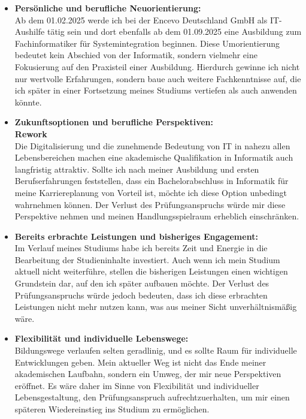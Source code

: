 \documentclass[a4paper,12pt]{article}
\begin{document}
\begin{itemize}[label={-}, labelwidth=2em, left=1em]
\item \textbf{Persönliche und berufliche Neuorientierung:}\\
Ab dem 01.02.2025 werde ich bei der Encevo Deutschland GmbH als IT-Aushilfe tätig sein und dort ebenfalls ab dem 01.09.2025 eine Ausbildung zum Fachinformatiker für Systemintegration beginnen.
Diese Umorientierung bedeutet kein Abschied von der Informatik, sondern vielmehr eine Fokusierung auf den Praxisteil einer Ausbildung.
Hierdurch gewinne ich nicht nur wertvolle Erfahrungen, sondern baue auch weitere Fachkenntnisse auf, die ich später in einer Fortsetzung meines Studiums vertiefen als auch anwenden könnte.

\break
\item \textbf{Zukunftsoptionen und berufliche Perspektiven:}\\
\textbf{Rework}\\
Die Digitalisierung und die zunehmende Bedeutung von IT in nahezu allen Lebensbereichen machen eine akademische Qualifikation in Informatik auch langfristig attraktiv.
Sollte ich nach meiner Ausbildung und ersten Berufserfahrungen feststellen, dass ein Bachelorabschluss in Informatik für meine Karriereplanung von Vorteil ist, möchte ich diese Option unbedingt wahrnehmen können.
Der Verlust des Prüfungsanspruchs würde mir diese Perspektive nehmen und meinen Handlungsspielraum erheblich einschränken.

\item \textbf{Bereits erbrachte Leistungen und bisheriges Engagement:}\\
Im Verlauf meines Studiums habe ich bereits Zeit und Energie in die Bearbeitung der Studieninhalte investiert.
Auch wenn ich mein Studium aktuell nicht weiterführe, stellen die bisherigen Leistungen einen wichtigen Grundstein dar, auf den ich später aufbauen möchte.
Der Verlust des Prüfungsanspruchs würde jedoch bedeuten, dass ich diese erbrachten Leistungen nicht mehr nutzen kann, was aus meiner Sicht unverhältnismäßig wäre.

\item \textbf{Flexibilität und individuelle Lebenswege:}\\
Bildungswege verlaufen selten geradlinig, und es sollte Raum für individuelle Entwicklungen geben.
Mein aktueller Weg ist nicht das Ende meiner akademischen Laufbahn, sondern ein Umweg, der mir neue Perspektiven eröffnet.
Es wäre daher im Sinne von Flexibilität und individueller Lebensgestaltung, den Prüfungsanspruch aufrechtzuerhalten, um mir einen späteren Wiedereinstieg ins Studium zu ermöglichen.
\\
\end{itemize}
\end{document}
